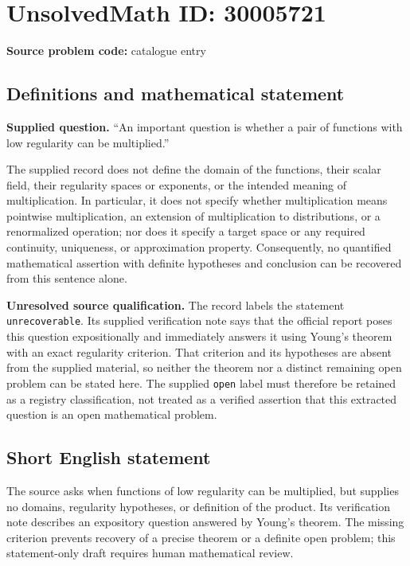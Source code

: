 \documentclass[11pt]{article}
\begin{document}
\section*{UnsolvedMath ID: 30005721}
\textbf{Source problem code:} catalogue entry
\subsection{Definitions and mathematical statement}
\textbf{Supplied question.} ``An important question is whether a pair of functions with low regularity can be multiplied.''

The supplied record does not define the domain of the functions, their scalar field, their regularity spaces or exponents, or the intended meaning of multiplication. In particular, it does not specify whether multiplication means pointwise multiplication, an extension of multiplication to distributions, or a renormalized operation; nor does it specify a target space or any required continuity, uniqueness, or approximation property. Consequently, no quantified mathematical assertion with definite hypotheses and conclusion can be recovered from this sentence alone.

\textbf{Unresolved source qualification.} The record labels the statement \texttt{unrecoverable}. Its supplied verification note says that the official report poses this question expositionally and immediately answers it using Young's theorem with an exact regularity criterion. That criterion and its hypotheses are absent from the supplied material, so neither the theorem nor a distinct remaining open problem can be stated here. The supplied \texttt{open} label must therefore be retained as a registry classification, not treated as a verified assertion that this extracted question is an open mathematical problem.
\subsection{Short English statement}
The source asks when functions of low regularity can be multiplied, but supplies no domains, regularity hypotheses, or definition of the product. Its verification note describes an expository question answered by Young's theorem. The missing criterion prevents recovery of a precise theorem or a definite open problem; this statement-only draft requires human mathematical review.
\end{document}
